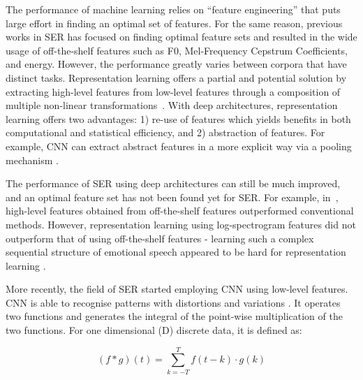 \documentclass[conference, compsoc, twoside]{IEEEtran}
\begin{document}
The performance of machine learning relies on ``feature engineering'' that puts large effort in finding an optimal set of features. For the same reason, previous works in SER has focused on finding optimal feature sets and resulted in the wide usage of off-the-shelf features such as F0, Mel-Frequency Cepstrum Coefficients, and energy. However, the performance greatly varies between corpora that have distinct tasks. Representation learning offers a partial and potential solution by extracting high-level features from low-level features through a composition of multiple non-linear transformations~\cite{bengio2013representation}. With deep architectures, representation learning offers two advantages: 1) re-use of features which yields benefits in both computational and statistical efficiency, and 2) abstraction of features. For example, CNN can extract abstract features in a more explicit way via a pooling mechanism \cite{lecun1995convolutional}. 

The performance of SER using deep architectures can still be much improved, and an optimal feature set has not been found yet for SER. For example, in~\cite{kunHan2014dnn,lee2015high,kim2017interspeech}, high-level features obtained from off-the-shelf features outperformed conventional methods. However, representation learning using log-spectrogram features did not outperform that of using off-the-shelf features - learning such a complex sequential structure of emotional speech appeared to be hard for representation learning \cite{ghoshrepresentation2016}. 

More recently, the field of SER started employing CNN using low-level features. CNN is able to recognise patterns with distortions and variations \cite{lecun1995convolutional}. It operates two functions and generates the integral of the point-wise multiplication of the two functions. For one dimensional (D) discrete data, it is defined as:

\begin{equation} \label{eq:highway-1}
  (f \ast g)(t) = \displaystyle \sum_{k=-T}^{T} f(t-k) \cdot g(k)
\end{equation}
\end{document}
